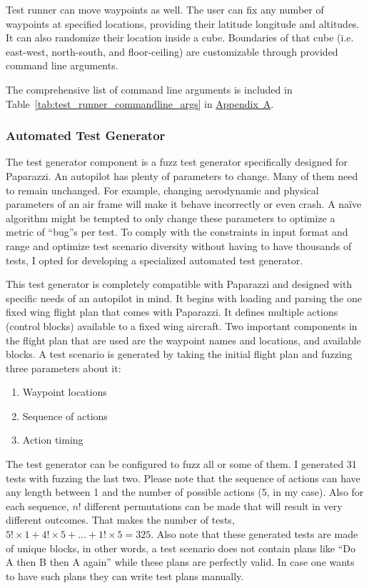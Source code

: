 Test runner can move waypoints as well. The user can fix any number of waypoints at specified locations, providing their latitude longitude and altitudes. It can also randomize their location inside a cube. Boundaries of that cube (i.e. east-west, north-south, and floor-ceiling) are customizable through provided command line arguments.

The comprehensive list of command line arguments is included in Table~\ref{tab:test_runner_commandline_args} in \hyperref[appendixa]{Appendix~A}.


\subsubsection{Automated Test Generator}
The test generator component is a fuzz test generator specifically designed for Paparazzi. An autopilot has plenty of parameters to change. Many of them need to remain unchanged. For example, changing aerodynamic and physical parameters of an air frame will make it behave incorrectly or even crash. A naïve algorithm might be tempted to only change these parameters to optimize a metric of ``bug''s per test. To comply with the constraints in input format and range and optimize test scenario diversity without having to have thousands of tests, I opted for developing a specialized automated test generator. 

This test generator is completely compatible with Paparazzi and designed with specific needs of an autopilot in mind. It begins with loading and parsing the one fixed wing flight plan that comes with Paparazzi. It defines multiple actions (control blocks) available to a fixed wing aircraft. Two important components in the flight plan that are used are the waypoint names and locations, and available blocks. A test scenario is generated by taking the initial flight plan and fuzzing three parameters about it:
\begin{enumerate}
    \item Waypoint locations
    \item Sequence of actions 
    \item Action timing
\end{enumerate}

The test generator can be configured to fuzz all or some of them. I generated 31 tests with fuzzing the last two. Please note that the sequence of actions can have any length between 1 and the number of possible actions (5, in my case). Also for each sequence, $n!$ different permutations can be made that will result in very different outcomes. That makes the number of tests, $5!\times1+4!\times5+\ldots+1!\times5=325$. Also note that these generated tests are made of unique blocks, in other words, a test scenario does not contain plans like ``Do A then B then A again'' while these plans are perfectly valid. In case one wants to have such plans they can write test plans manually.

